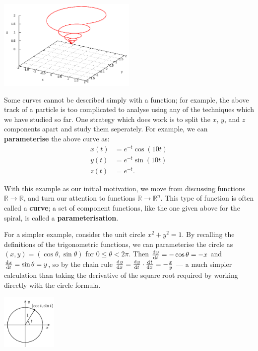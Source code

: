 


\begin{center}
  \includegraphics[width=0.5\textwidth]{space-curve-4}
\end{center}
Some curves cannot be described simply with a function; for example, the above track of a particle is
too complicated to analyse using any of the techniques which we have studied so far. One strategy which
does work is to split the $ x $, $ y $, and $ z $ components apart and study them seperately. For
example, we can \textbf{parameterise} the above curve as:
\begin{align*}
  x(t) &= e^{-t} \cos(10t)\\
  y(t) &= e^{-t} \sin(10t)\\
  z(t) &= e^{-t}.
\end{align*}

With this example as our initial motivation, we move from discussing functions $ \mathbb{R} \rightarrow \mathbb{R} $, and turn our attention to
functions $ \mathbb{R} \rightarrow \mathbb{R}^n $. This type of function is often called a \textbf{curve}; a set of component functions, like the
one given above for the spiral, is called a \textbf{parameterisation}.

For a simpler example, consider the unit circle $ x^2 + y^2 = 1 $. By recalling the definitions
of the trigonometric functions, we can parameterise the circle as $ (x, y) = (\cos \theta, \sin \theta) $
for $ 0 \leq \theta < 2\pi $. Then $ \od{y}{t} = -\cos \theta = -x $ and $ \od{x}{t} = \sin \theta = y $,
so by the chain rule $ \od{y}{x} = \od{y}{t} \cdot \od{t}{x} = -\frac{x}{y} $ --- a much simpler calculation
than taking the derivative of the square root required by working directly with the circle formula.

\begin{center}
  \includegraphics[width=0.2\textwidth]{circle}
\end{center}

